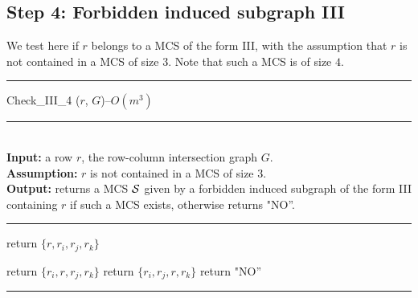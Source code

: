 \documentclass{article}
\begin{document}
\subsection{Step 4: Forbidden induced subgraph III}

We test here if $r$ belongs to a MCS of the form III, 
with the assumption that  $r$ is not contained in a MCS of size $3$.
Note that such a MCS is of size $4$.

\begin{algorithm}[htpb]                    
\rule{11.7cm}{0.01cm}
\caption{Check\_III\_4 ($r$, $G$)--$O(m^3)$}
\rule{11.7cm}{0.01cm}
\\
{\bf Input:} a row $r$, the row-column intersection graph $G$.\\
{\bf Assumption:}  $r$ is not contained in a MCS of size $3$.\\
{\bf Output:} returns a MCS ${\cal S}$ given by a forbidden induced subgraph of 
the form III containing $r$ if such a MCS exists, otherwise returns  "NO''.
\rule{11.7cm}{0.01cm}
\begin{algorithmic}[1]
\STATE return $\{r,r_i,r_j,r_k\}$
\ENDIF
\ENDFOR 

\STATE return $\{r_i,r,r_j,r_k\}$
\ENDIF
\ENDFOR 
{}
\STATE return $\{r_i,r_j,r,r_k\}$
\ENDIF
\ENDFOR 
\STATE return "NO''
\end{algorithmic}
\rule{11.7cm}{0.01cm}
\end{algorithm}
\end{document}
